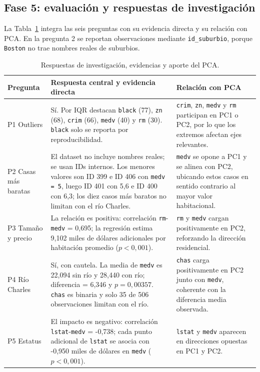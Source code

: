 \documentclass[10pt,a4paper]{article}
\begin{document}
\subsection{Fase 5: evaluación y respuestas de investigación}

La Tabla~\ref{tab:resumen_preguntas} integra las seis preguntas con su evidencia directa y su relación con PCA. En la pregunta 2 se reportan observaciones mediante \texttt{id\_suburbio}, porque \texttt{Boston} no trae nombres reales de suburbios.

\begin{table}[H]
  \centering
  \caption{Respuestas de investigación, evidencias y aporte del PCA.}
  \label{tab:resumen_preguntas}
  \footnotesize
  \begin{tabularx}{\textwidth}{p{2.2cm} X X}
    \toprule
    \textbf{Pregunta} & \textbf{Respuesta central y evidencia directa} & \textbf{Relación con PCA} \\
    \midrule
    P1 Outliers & Sí. Por IQR destacan \texttt{black} (77), \texttt{zn} (68), \texttt{crim} (66), \texttt{medv} (40) y \texttt{rm} (30). \texttt{black} solo se reporta por reproducibilidad. & \texttt{crim}, \texttt{zn}, \texttt{medv} y \texttt{rm} participan en PC1 o PC2, por lo que los extremos afectan ejes relevantes. \\
    P2 Casas más baratas & El dataset no incluye nombres reales; se usan IDs internos. Los menores valores son ID 399 e ID 406 con \texttt{medv = 5}, luego ID 401 con 5,6 e ID 400 con 6,3; los diez casos más baratos no limitan con el río Charles. & \texttt{medv} se opone a PC1 y se alinea con PC2, ubicando estos casos en sentido contrario al mayor valor habitacional. \\
    P3 Tamaño y precio & La relación es positiva: correlación \texttt{rm}-\texttt{medv} = 0,695; la regresión estima 9,102 miles de dólares adicionales por habitación promedio ($p < 0,001$). & \texttt{rm} y \texttt{medv} cargan positivamente en PC2, reforzando la dirección residencial. \\
    P4 Río Charles & Sí, con cautela. La media de \texttt{medv} es 22,094 sin río y 28,440 con río; diferencia = 6,346 y $p = 0,00357$. \texttt{chas} es binaria y solo 35 de 506 observaciones limitan con el río. & \texttt{chas} carga positivamente en PC2 junto con \texttt{medv}, coherente con la diferencia media observada. \\
    P5 Estatus & El impacto es negativo: correlación \texttt{lstat}-\texttt{medv} = -0,738; cada punto adicional de \texttt{lstat} se asocia con -0,950 miles de dólares en \texttt{medv} ($p < 0,001$). & \texttt{lstat} y \texttt{medv} aparecen en direcciones opuestas en PC1 y PC2. \\

\end{tabularx}
\end{table}
\end{document}
